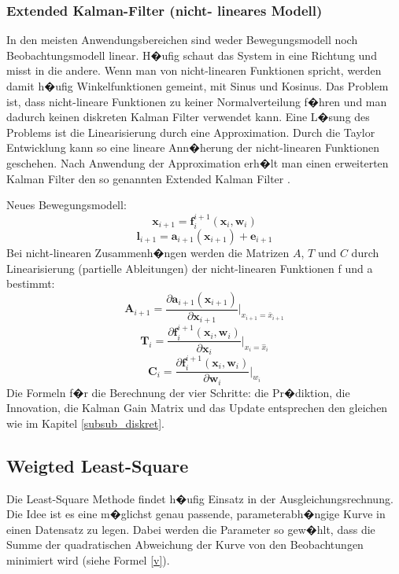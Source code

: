 \subsubsection{Extended Kalman-Filter (nicht- lineares Modell)}
In den meisten Anwendungsbereichen sind weder Bewegungsmodell noch Beobachtungsmodell linear. H�ufig schaut das System in eine Richtung und misst in die andere. Wenn man von nicht-linearen Funktionen spricht, werden damit h�ufig Winkelfunktionen gemeint, mit Sinus und Kosinus. Das Problem ist, dass nicht-lineare Funktionen zu keiner Normalverteilung f�hren und man dadurch keinen diskreten Kalman Filter verwendet kann. Eine L�sung des Problems ist die Linearisierung durch eine Approximation. Durch die Taylor Entwicklung kann so eine lineare Ann�herung der nicht-linearen Funktionen geschehen. Nach Anwendung der Approximation erh�lt man einen erweiterten Kalman Filter den so genannten Extended Kalman Filter \parencite{teil2}. 

Neues Bewegungsmodell:
\begin{equation}
\boldsymbol{x}_{i+1} = \boldsymbol{f}^{i+1}_i(\boldsymbol{x}_i, \boldsymbol{w}_i)
\end{equation}
\begin{equation}
\boldsymbol{l}_{i+1} = \boldsymbol{a}_{i+1}(\boldsymbol{x}_{i+1}) + \boldsymbol{e}_{i+1}
\end{equation}
Bei nicht-linearen Zusammenh�ngen werden die Matrizen $A$, $T$ und $C$ durch Linearisierung (partielle Ableitungen) der nicht-linearen Funktionen f und a bestimmt:
\begin{equation}
	\boldsymbol{A}_{i+1}= \frac{\partial \boldsymbol{a}_{i+1}(\boldsymbol{x}_{i+1})}{\partial \boldsymbol{x}_{i+1}} \bigg|_{x_{i+1} = \bar{x}_{i+1}}
\end{equation}
\begin{equation}
\boldsymbol{T}_i = \frac{\partial \boldsymbol{f}_i^{i+1}(\boldsymbol{x}_i,\boldsymbol{w}_i)}{\partial \boldsymbol{x}_i} \bigg|_{x_i = \hat{x}_i}
\end{equation}
\begin{equation}
\boldsymbol{C}_i = \frac{\partial \boldsymbol{f}_i^{i+1}(\boldsymbol{x}_i,\boldsymbol{w}_i)}{\partial \boldsymbol{w}_i} \bigg|_{w_i}
\end{equation}
Die Formeln f�r die Berechnung der vier Schritte: die Pr�diktion, die Innovation, die Kalman Gain Matrix und das Update entsprechen den gleichen wie im Kapitel \ref{subsub_diskret}. 

\subsection{Weigted Least-Square}
Die Least-Square Methode findet h�ufig Einsatz in der Ausgleichungsrechnung. Die Idee ist es eine m�glichst genau passende, parameterabh�ngige Kurve in einen Datensatz zu legen. Dabei werden die Parameter so gew�hlt, dass die Summe der quadratischen Abweichung der Kurve von den Beobachtungen minimiert wird (siehe Formel \ref{v}). 

